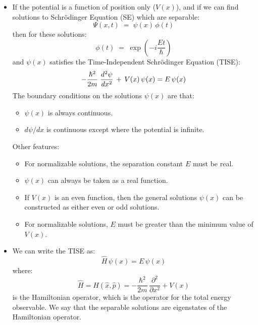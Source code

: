 \documentclass[12pt]{article}
\begin{document}
\begin{itemize}

\item If the potential is a function of position only ($V(x)$), and if we can find solutions to Schr\"odinger Equation (SE) which are separable:
\begin{equation}
\Psi(x,t) \; = \; \psi(x) \,\phi(t)
\end{equation}
then for these solutions:
\begin{equation}
\phi(t) \; = \; \exp\left( -i\frac{Et}{\hbar}\right)
\end{equation}
and $\psi(x)$ satisfies the Time-Independent Schr\"odinger Equation (TISE):
\begin{equation}
- \frac{\hbar^2}{2 m} \;  \frac{d^2 \psi}{dx^2}  \, + \, V(x) \, \psi(x) = E \, \psi(x)\\
\end{equation}
The boundary conditions on the solutions $\psi(x)$ are that:
\begin{itemize}
\item $\psi(x)$ is always continuous.
\item $d\psi/dx$ is continuous except where the potential is infinite.
\end{itemize}
Other features:
\begin{itemize}
\item For normalizable solutions, the separation constant $E$ must be real.
\item $\psi(x)$ can always be taken as a real function.
\item If $V(x)$ is an even function, then the general solutions $\psi(x)$ can be constructed as either even or odd solutions.
\item For normalizable solutions, $E$ must be greater than the minimum value of $V(x)$.
\end{itemize}
\item We can write the TISE as:
\begin{equation}
\hat{H} \, \psi(x) = E \, \psi(x)
\end{equation}
where:
\begin{equation}
\hat{H} = H(\hat{x}, \hat{p})= -\frac{\hbar^2}{2m}\,\frac{\partial^2}{\partial x^2} + V(x)
\end{equation}
is the Hamiltonian operator, which is the operator for the total energy observable.  We say that the separable solutions are eigenstates of the Hamiltonian operator.


\end{itemize}
\end{document}

